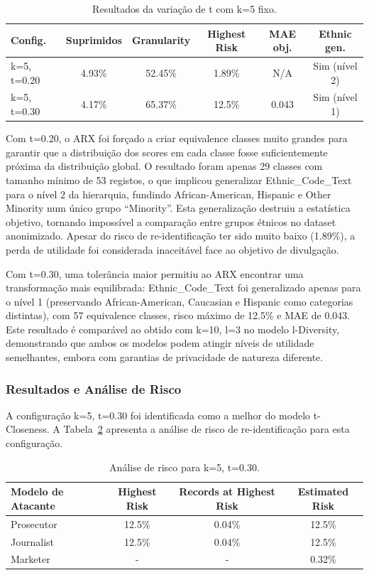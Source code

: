 \begin{table}[H]
\centering
\caption{Resultados da variação de t com k=5 fixo.}
\label{tab:variacao_t}
\begin{tabular}{lccccc}
\toprule
\textbf{Config.} & \textbf{Suprimidos} & \textbf{Granularity} & \textbf{Highest Risk} & \textbf{MAE obj.} & \textbf{Ethnic gen.} \\
\midrule
k=5, t=0.20 & 4.93\% & 52.45\% & 1.89\% & N/A & Sim (nível 2) \\
k=5, t=0.30 & 4.17\% & 65.37\% & 12.5\% & 0.043 & Sim (nível 1) \\
\bottomrule
\end{tabular}
\end{table}

Com t=0.20, o ARX foi forçado a criar equivalence classes muito grandes para garantir que a distribuição dos scores em cada classe fosse suficientemente próxima da distribuição global. O resultado foram apenas 29 classes com tamanho mínimo de 53 registos, o que implicou generalizar Ethnic\_Code\_Text para o nível 2 da hierarquia, fundindo African-American, Hispanic e Other Minority num único grupo ``Minority''. Esta generalização destruiu a estatística objetivo, tornando impossível a comparação entre grupos étnicos no dataset anonimizado. Apesar do risco de re-identificação ter sido muito baixo (1.89\%), a perda de utilidade foi considerada inaceitável face ao objetivo de divulgação.

Com t=0.30, uma tolerância maior permitiu ao ARX encontrar uma transformação mais equilibrada: Ethnic\_Code\_Text foi generalizado apenas para o nível 1 (preservando African-American, Caucasian e Hispanic como categorias distintas), com 57 equivalence classes, risco máximo de 12.5\% e MAE de 0.043. Este resultado é comparável ao obtido com k=10, l=3 no modelo l-Diversity, demonstrando que ambos os modelos podem atingir níveis de utilidade semelhantes, embora com garantias de privacidade de natureza diferente.

\subsubsection{Resultados e Análise de Risco}

A configuração k=5, t=0.30 foi identificada como a melhor do modelo t-Closeness. A Tabela~\ref{tab:risco_tclos} apresenta a análise de risco de re-identificação para esta configuração.

\begin{table}[H]
\centering
\caption{Análise de risco para k=5, t=0.30.}
\label{tab:risco_tclos}
\begin{tabular}{lccc}
\toprule
\textbf{Modelo de Atacante} & \textbf{Highest Risk} & \textbf{Records at Highest Risk} & \textbf{Estimated Risk} \\
\midrule
Prosecutor & 12.5\% & 0.04\% & 12.5\% \\
Journalist & 12.5\% & 0.04\% & 12.5\% \\
Marketer & - & - & 0.32\% \\
\bottomrule
\end{tabular}
\end{table}

